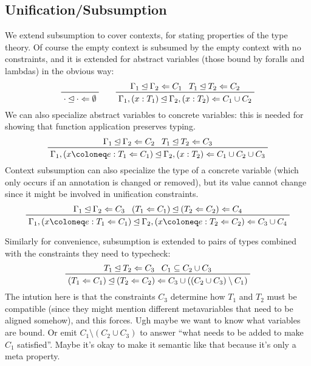 \documentclass[11pt, twoside, reqno]{book}
\newcommand{\subsumedBy}{\unlhd}
\begin{document}
\begin{appdices}
\section{Unification/Subsumption}
We extend subsumption to cover contexts, for stating properties of the type theory.
Of course the empty context is subsumed by the empty context with no constraints, and it is extended for abstract variables (those bound by foralls and lambdas) in the obvious way:
\begin{displaymath}
\prftree{\cdot \subsumedBy \cdot \Leftarrow \emptyset}
\qquad
\prftree{\Gamma_1 \subsumedBy \Gamma_2 \Leftarrow C_1}{T_1 \subsumedBy T_2 \Leftarrow C_2}{\Gamma_1, (x : T_1) \subsumedBy \Gamma_2, (x : T_2) \Leftarrow C_1 \cup C_2}
\end{displaymath}
We can also specialize abstract variables to concrete variables: this is needed for showing that function application preserves typing.
\begin{displaymath}
\prftree{\Gamma_1 \subsumedBy \Gamma_2 \Leftarrow C_2}{T_1 \subsumedBy T_2 \Leftarrow C_3}{\Gamma_1, (x \coloneq e : T_1 \Leftarrow C_1) \subsumedBy \Gamma_2, (x : T_2) \Leftarrow C_1 \cup C_2 \cup C_3}
\end{displaymath}
Context subsumption can also specialize the type of a concrete variable (which only occurs if an annotation is changed or removed), but its value cannot change since it might be involved in unification constraints.
\begin{displaymath}
\prftree{\Gamma_1 \subsumedBy \Gamma_2 \Leftarrow C_3}{(T_1 \Leftarrow C_1) \subsumedBy (T_2 \Leftarrow C_2) \Leftarrow C_4}{\Gamma_1, (x \coloneq e : T_1 \Leftarrow C_1) \subsumedBy \Gamma_2, (x \coloneq e : T_2 \Leftarrow C_2) \Leftarrow C_3 \cup C_4}
\end{displaymath}

Similarly for convenience, subsumption is extended to pairs of types combined with the constraints they need to typecheck:
\begin{displaymath}
\prftree{T_1 \subsumedBy T_2 \Leftarrow C_3}{C_1 \subseteq C_2 \cup C_3}{(T_1 \Leftarrow C_1) \subsumedBy (T_2 \Leftarrow C_2) \Leftarrow C_3 \cup ((C_2 \cup C_3) \setminus C_1)}
\end{displaymath}
The intution here is that the constraints \(C_3\) determine how \(T_1\) and \(T_2\) must be compatible (since they might mention different metavariables that need to be aligned somehow), and this forces.
Ugh maybe we want to know what variables are bound.
Or emit \(C_1 \setminus (C_2 \cup C_3)\) to answer ``what needs to be added to make \(C_1\) satisfied''.
Maybe it's okay to make it semantic like that because it's only a meta property.


\end{appdices}
\end{document}
